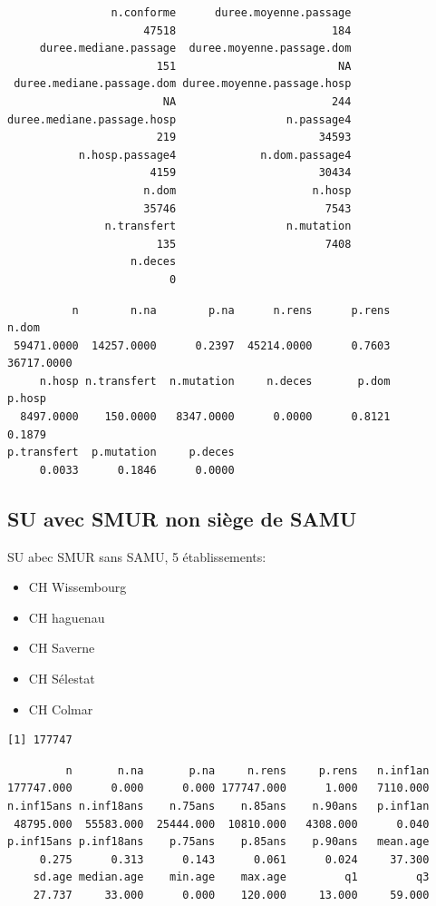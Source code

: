 \documentclass[]{article}
\begin{document}
\begin{verbatim}
                n.conforme      duree.moyenne.passage 
                     47518                        184 
     duree.mediane.passage  duree.moyenne.passage.dom 
                       151                         NA 
 duree.mediane.passage.dom duree.moyenne.passage.hosp 
                        NA                        244 
duree.mediane.passage.hosp                 n.passage4 
                       219                      34593 
           n.hosp.passage4             n.dom.passage4 
                      4159                      30434 
                     n.dom                     n.hosp 
                     35746                       7543 
               n.transfert                 n.mutation 
                       135                       7408 
                   n.deces 
                         0 
\end{verbatim}

\begin{verbatim}
          n        n.na        p.na      n.rens      p.rens       n.dom 
 59471.0000  14257.0000      0.2397  45214.0000      0.7603  36717.0000 
     n.hosp n.transfert  n.mutation     n.deces       p.dom      p.hosp 
  8497.0000    150.0000   8347.0000      0.0000      0.8121      0.1879 
p.transfert  p.mutation     p.deces 
     0.0033      0.1846      0.0000 
\end{verbatim}

\subsection{SU avec SMUR non siège de
SAMU}\label{su-avec-smur-non-siege-de-samu}

SU abec SMUR sans SAMU, 5 établissements:

\begin{itemize}
\itemsep1pt\parskip0pt
\item
  CH Wissembourg
\item
  CH haguenau
\item
  CH Saverne
\item
  CH Sélestat
\item
  CH Colmar
\end{itemize}

\begin{verbatim}
[1] 177747
\end{verbatim}

\begin{verbatim}
         n       n.na       p.na     n.rens     p.rens   n.inf1an 
177747.000      0.000      0.000 177747.000      1.000   7110.000 
n.inf15ans n.inf18ans    n.75ans    n.85ans    n.90ans   p.inf1an 
 48795.000  55583.000  25444.000  10810.000   4308.000      0.040 
p.inf15ans p.inf18ans    p.75ans    p.85ans    p.90ans   mean.age 
     0.275      0.313      0.143      0.061      0.024     37.300 
    sd.age median.age    min.age    max.age         q1         q3 
    27.737     33.000      0.000    120.000     13.000     59.000 
\end{verbatim}
\end{document}
